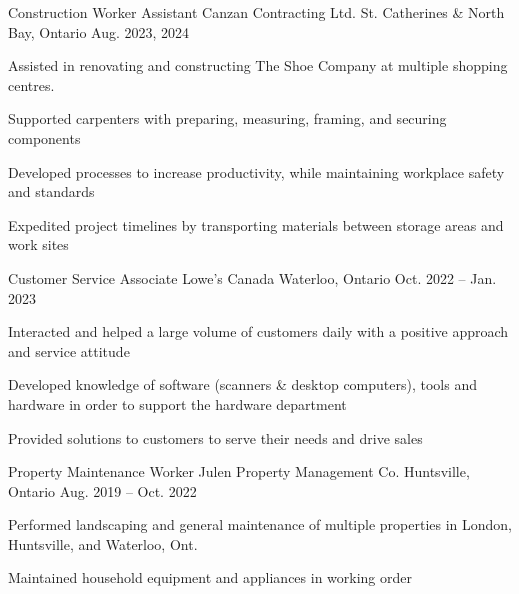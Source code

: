 

\begin{cventries}
  \cventry
    {Construction Worker Assistant} %
    {Canzan Contracting Ltd.} %
    {St. Catherines \& North Bay, Ontario} %
    {Aug. 2023, 2024} %
    {
      \begin{cvitems} %
        \item {Assisted in renovating and constructing The Shoe Company at multiple shopping centres.}
        \item {Supported carpenters with preparing, measuring, framing, and securing components}
        \item {Developed processes to increase productivity, while maintaining workplace safety and standards}
        \item {Expedited project timelines by transporting materials between storage areas and work sites}
      \end{cvitems}
    }

  \cventry
    {Customer Service Associate} %
    {Lowe's Canada} %
    {Waterloo, Ontario} %
    {Oct. 2022 -- Jan. 2023} %
    {
      \begin{cvitems} %
        \item {Interacted and helped a large volume of customers daily with a positive approach and service attitude}
        \item {Developed knowledge of software (scanners \& desktop computers), tools and hardware in order to support the hardware department}
        \item {Provided solutions to customers to serve their needs and drive sales}
      \end{cvitems}
    }
  \cventry
    {Property Maintenance Worker} %
    {Julen Property Management Co.} %
    {Huntsville, Ontario} %
    {Aug. 2019 -- Oct. 2022} %
    {
      \begin{cvitems} %
        \item{Performed landscaping and general maintenance of multiple properties in London, Huntsville, and Waterloo, Ont.}
        \item{Maintained household equipment and appliances in working order}
      \end{cvitems}
    }


\end{cventries}
